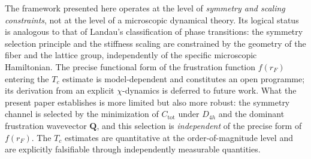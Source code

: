   The framework presented here operates at the level of \emph{symmetry and scaling
constraints}, not at the level of a microscopic dynamical theory.
  Its logical status is analogous to that of Landau's classification of phase transitions:
  the symmetry selection principle and the stiffness scaling are constrained by the
  geometry of the fiber and the lattice group, independently of the specific microscopic
  Hamiltonian.
  The precise functional form of the frustration function $f(r_F)$ entering the $T_c$
  estimate is model-dependent and constitutes an open programme; its derivation from
  an explicit $\chi$-dynamics is deferred to future work.
  What the present paper establishes is more limited but also more robust: the symmetry
  channel is selected by the minimization of $C_\textrm{tot}$ under $D_{4h}$ and
  the dominant frustration wavevector $\mathbf{Q}$, and this selection is \emph{independent}
  of the precise form of $f(r_F)$.
  The $T_c$ estimates are quantitative at the order-of-magnitude level and are
  explicitly falsifiable through independently measurable quantities.
